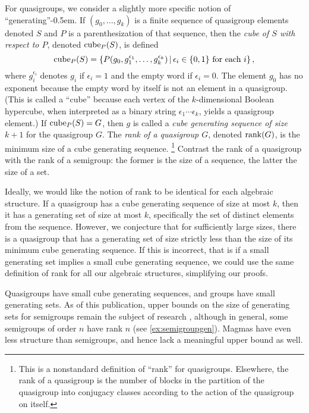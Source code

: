 For quasigroups, we consider a slightly more specific notion of ``generating''\kern-0.5em.
If $(g_0, \dotsc, g_k)$ is a finite sequence of quasigroup elements denoted $S$ and $P$ is a parenthesization of that sequence, then the \emph{cube of $S$ with respect to $P$}, denoted $\operatorname{cube}_P(S)$, is defined
\begin{equation*}
  \operatorname{cube}_P(S) = \left\{P(g_0, g_1^{\epsilon_1}, \dotsc, g_k^{\epsilon_k}) \, \middle| \, \epsilon_i \in \{0, 1\} \text{ for each } i \right\},
\end{equation*}
where $g_i^{\epsilon_i}$ denotes $g_i$ if $\epsilon_i = 1$ and the empty word if $\epsilon_i = 0$.
The element $g_0$ has no exponent because the empty word by itself is not an element in a quasigroup.
(This is called a ``cube'' because each vertex of the $k$-dimensional Boolean hypercube, when interpreted as a binary string $\epsilon_1 \dotsb \epsilon_k$, yields a quasigroup element.)
If $\operatorname{cube}_P(S) = G$, then $g$ is called a \emph{cube generating sequence of size $k + 1$} for the quasigroup $G$.
The \emph{rank of a quasigroup $G$}, denoted $\operatorname{rank}(G)$, is the minimum size of a cube generating sequence.%
\footnote{
  This is a nonstandard definition of ``rank'' for quasigroups.
  Elsewhere, the rank of a quasigroup is the number of blocks in the partition of the quasigroup into conjugacy classes according to the action of the quasigroup on itself.
}
Contrast the rank of a quasigroup with the rank of a semigroup: the former is the size of a sequence, the latter the size of a set.


Ideally, we would like the notion of rank to be identical for each algebraic structure.
If a quasigroup has a cube generating sequence of size at most $k$, then it has a generating set of size at most $k$, specifically the set of distinct elements from the sequence.
However, we conjecture that for sufficiently large sizes, there is a quasigroup that has a generating set of size strictly less than the size of its minimum cube generating sequence.
If this is incorrect, that is if a small generating set implies a small cube generating sequence, we could use the same definition of rank for all our algebraic structures, simplifying our proofs.

Quasigroups have small cube generating sequences, and groups have small generating sets.
As of this publication, upper bounds on the size of generating sets for semigroups remain the subject of research \autocite{gray14}, although in general, some semigroups of order $n$ have rank $n$ (see \autoref{ex:semigroupgen}).
Magmas have even less structure than semigroups, and hence lack a meaningful upper bound as well.

